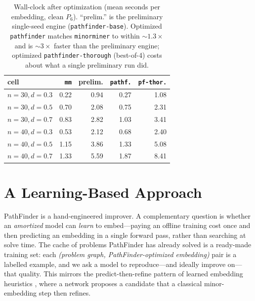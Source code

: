 \documentclass[acmsmall,anonymous,nonacm]{acmart}
\begin{document}
\begin{table}[t]
\caption{Wall-clock after optimization (mean seconds per embedding, clean $P_6$).
``prelim.'' is the preliminary single-seed engine (\texttt{pathfinder-base}).
Optimized \texttt{pathfinder} matches \texttt{minorminer} to within ${\sim}1.3\times$
and is ${\sim}3\times$ faster than the preliminary engine; optimized
\texttt{pathfinder-thorough} (best-of-4) costs about what a single preliminary run
did.}
\label{tab:opttime}
\small
\begin{tabular}{lrrrr}
\toprule
cell & \texttt{mm} & prelim. & \texttt{pathf.} & \texttt{pf-thor.} \\
\midrule
$n{=}30,d{=}0.3$ & 0.22 & 0.94 & 0.27 & 1.08 \\
$n{=}30,d{=}0.5$ & 0.70 & 2.08 & 0.75 & 2.31 \\
$n{=}30,d{=}0.7$ & 0.83 & 2.82 & 1.03 & 3.41 \\
$n{=}40,d{=}0.3$ & 0.53 & 2.12 & 0.68 & 2.40 \\
$n{=}40,d{=}0.5$ & 1.15 & 3.86 & 1.33 & 5.08 \\
$n{=}40,d{=}0.7$ & 1.33 & 5.59 & 1.87 & 8.41 \\
\bottomrule
\end{tabular}
\end{table}

\section{A Learning-Based Approach}
\label{sec:learning}

PathFinder is a hand-engineered improver. A complementary question is whether an
\emph{amortized} model can \emph{learn} to embed---paying an offline training cost
once and then predicting an embedding in a single forward pass, rather than
searching at solve time. The cache of problems PathFinder has already solved is a
ready-made training set: each \emph{(problem graph, PathFinder-optimized embedding)}
pair is a labelled example, and we ask a model to reproduce---and ideally improve
on---that quality. This mirrors the predict-then-refine pattern of learned
embedding heuristics \cite{ngo2024charme,nembrini2025ppo}, where a network proposes
a candidate that a classical minor-embedding step then refines.
\end{document}
